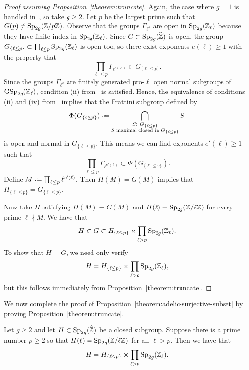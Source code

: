 	\begin{proof}[Proof assuming Proposition~\ref{theorem:truncate}]
		Again, the case where $g = 1$ is handled in~\cite[Lemma 7.6]{zywina2010hilbert}, so take $g \geq 2$. Let $p$ be the largest prime such that $G(p) \neq \operatorname{Sp}_{2g}({\mathbb Z} / p \mathbb Z)$.
		Observe that the groups $\Gamma_{\ell^k}$ are open in $\operatorname{Sp}_{2g}(\mathbb Z_\ell)$ because they have finite index in $\operatorname{Sp}_{2g}(\mathbb Z_\ell)$. Since $G \subset \operatorname{Sp}_{2g}(\widehat{{\mathbb Z}})$ is open, the group $G_{\{\ell \le p\}} \subset \prod_{\ell \le p} \operatorname{Sp}_{2g}(\mathbb Z_\ell)$ is open too, so there exist exponents $e(\ell) \ge 1$ with the property that
		\[
			\prod_{\ell \le p} \Gamma_{\ell^{e(\ell)}} \subset G_{\{\ell \le p \}}.
		\]
		Since the groups $\Gamma_{\ell^k}$ are finitely generated pro-$\ell$ open normal subgroups of $\operatorname{GSp}_{2g}(\mathbb Z_\ell)$, condition (ii) from~\cite[Proposition 10.6]{serre1989lectures} is satisfied. Hence,
		the equivalence of conditions (ii) and (iv) from~\cite[Proposition 10.6]{serre1989lectures} implies
		that the Frattini subgroup defined by
		\begin{align*}
		\Phi(G_{\{\ell \le p\}}) \defeq \bigcap_{\substack{S \subset G_{\{\ell \le p\}} \\ S \text{ maximal closed in  }G_{\{\ell \le p\}}}} S
		\end{align*}
		is open and normal in $G_{\{\ell \le p\}}$. This means we can find exponents $e'(\ell) \ge 1$ such that
		\[
			\prod_{\ell \le p} \Gamma_{\ell^{e'(\ell)}} \subset \Phi(G_{\{\ell \le p\}}).
		\]
		Define $M \defeq \prod_{\ell \le p} \ell^{e'(\ell)}$. Then $H(M) = G(M)$ implies that $H_{\{\ell \leq p\}} = G_{\{\ell \leq p\}}$.
		
		Now take $H$ satisfying $H(M) = G(M)$ and $H(\ell) = \operatorname{Sp}_{2g}({\mathbb Z} / \ell \mathbb Z)$ for every prime $\ell \nmid M$. We have that
		\[
			H \subset G \subset H_{\{\ell \le p\}} \times \prod_{\ell > p} \operatorname{Sp}_{2g}({\mathbb Z}_\ell).
		\]
		To show that $H = G$, we need only verify
		\[
			H = H_{\{\ell \le p\}} \times \prod_{\ell > p} \operatorname{Sp}_{2g}({\mathbb Z}_\ell),
		\]
		but this follows immediately from Proposition~\ref{theorem:truncate}.
	\end{proof}
We now complete the proof of Proposition~\ref{theorem:adelic-surjective-subset} by proving
Proposition~\ref{theorem:truncate}.

		\begin{proposition}
		\label{theorem:truncate}
		Let $g \geq 2$ and let $H \subset \operatorname{Sp}_{2g}(\widehat {\mathbb Z})$ be a closed subgroup. Suppose there is a prime number $p \ge 2$ so that $H(\ell) = \operatorname{Sp}_{2g}(\mathbb Z/ \ell \mathbb Z)$ for all $\ell > p$. Then we have that
		\begin{equation}\label{meanttofly}
		H = H_{\{\ell \le p\}} \times \prod_{\ell > p} \operatorname{Sp}_{2g}(\mathbb Z_\ell).
		\end{equation}
	\end{proposition}
